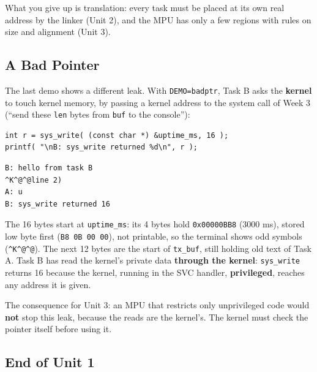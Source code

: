 What you give up is translation: every task must be placed at its own real address by the linker (Unit 2), and the MPU has only a few regions with rules on size and alignment (Unit 3).

\subsection{A Bad Pointer}

The last demo shows a different leak. With \texttt{DEMO=badptr}, Task B asks the \textbf{kernel} to touch kernel memory, by passing a kernel address to the system call of Week 3 (``send these \texttt{len} bytes from \texttt{buf} to the console''):

\begin{lstlisting}
int r = sys_write( (const char *) &uptime_ms, 16 );
printf( "\nB: sys_write returned %d\n", r );
\end{lstlisting}

\begin{lstlisting}
B: hello from task B
^K^@^@line 2)
A: u
B: sys_write returned 16
\end{lstlisting}

The 16 bytes start at \texttt{uptime\_ms}: its 4 bytes hold \texttt{0x00000BB8} (3000 ms), stored low byte first (\texttt{B8 0B 00 00}), not printable, so the terminal shows odd symbols (\texttt{\^{}K\^{}@\^{}@}). The next 12 bytes are the start of \texttt{tx\_buf}, still holding old text of Task A. Task B has read the kernel's private data \textbf{through the kernel}: \texttt{sys\_write} returns 16 because the kernel, running in the SVC handler, \textbf{privileged}, reaches any address it is given.

The consequence for Unit 3: an MPU that restricts only unprivileged code would \textbf{not} stop this leak, because the reads are the kernel's. The kernel must check the pointer itself before using it.

\subsection{End of Unit 1}


